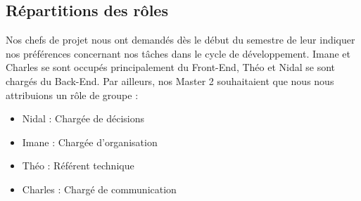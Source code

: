 \subsection{Répartitions des rôles}

Nos chefs de projet nous ont demandés dès le début du semestre de leur indiquer nos préférences concernant nos tâches dans le cycle de développement. Imane et Charles se sont occupés principalement du Front-End, Théo et Nidal se sont chargés du Back-End.
Par ailleurs, nos Master 2 souhaitaient que nous nous attribuions un rôle de groupe : 

\begin{itemize}
\item Nidal : Chargée de décisions
\item Imane : Chargée d'organisation
\item Théo : Référent technique
\item Charles : Chargé de communication
\end{itemize}